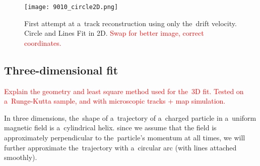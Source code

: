 			\begin{figure}
				\centering
				\texttt{[image: 9010\_circle2D.png]}
				\caption{First attempt at a~track reconstruction using only the~drift velocity. Circle and Lines Fit in 2D. \textcolor{red}{Swap for better image, correct coordinates.}}
				\label{fig:9010circle2D}
			\end{figure}
		
		\subsection{Three-dimensional fit}
			\textcolor{red}{Explain the geometry and least square method used for the~3D fit. Tested on a~Runge-Kutta sample, and with microscopic tracks + map simulation.}
			
			In three dimensions, the~shape of a~trajectory of a~charged particle in a~uniform magnetic field is a~cylindrical helix. since we assume that the field is approximately perpendicular to the~particle's momentum at all times, we will further approximate the~trajectory with a~circular arc (with lines attached smoothly).
			
